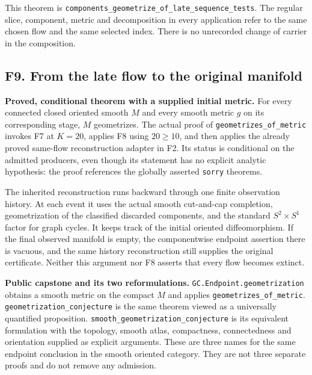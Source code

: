 \documentclass[
  letterpaper,
  11pt]{article}
\begin{document}
This theorem is
{\small\texttt{components\_\allowbreak{}geometrize\_\allowbreak{}of\_\allowbreak{}late\_\allowbreak{}sequence\_\allowbreak{}tests}}.
The regular slice, component, metric and decomposition in every
application refer to the same chosen flow and the same selected index.
There is no unrecorded change of carrier in the composition.

\subsection{F9. From the late flow to the original
manifold}\label{f9-capstone}

\textbf{Proved, conditional theorem with a supplied initial metric.} For
every connected closed oriented smooth \(M\) and every smooth metric
\(g\) on its corresponding stage, \(M\) geometrizes. The actual proof of
{\small\texttt{geometrizes\_\allowbreak{}of\_\allowbreak{}metric}}
invokes F7 at \(K=20\), applies F8 using \(20\geq10\), and then applies
the already proved same-flow reconstruction adapter in F2. Its status is
conditional on the admitted producers, even though its statement has no
explicit analytic hypothesis: the proof references the globally asserted
{\small\texttt{sorry}} theorems.

The inherited reconstruction runs backward through one finite
observation history. At each event it uses the actual smooth cut-and-cap
completion, geometrization of the classified discarded components, and
the standard \(S^2\times S^1\) factor for graph cycles. It keeps track
of the initial oriented diffeomorphism. If the final observed manifold
is empty, the componentwise endpoint assertion there is vacuous, and the
same history reconstruction still supplies the original certificate.
Neither this argument nor F8 asserts that every flow becomes extinct.

\textbf{Public capstone and its two reformulations.}
{\small\texttt{GC.\allowbreak{}Endpoint.\allowbreak{}geometrization}}
obtains a smooth metric on the compact \(M\) and applies
{\small\texttt{geometrizes\_\allowbreak{}of\_\allowbreak{}metric}}.
{\small\texttt{geometrization\_\allowbreak{}conjecture}} is the same
theorem viewed as a universally quantified proposition.
{\small\texttt{smooth\_\allowbreak{}geometrization\_\allowbreak{}conjecture}}
is its equivalent formulation with the topology, smooth atlas,
compactness, connectedness and orientation supplied as explicit
arguments. These are three names for the same endpoint conclusion in the
smooth oriented category. They are not three separate proofs and do not
remove any admission.
\end{document}
